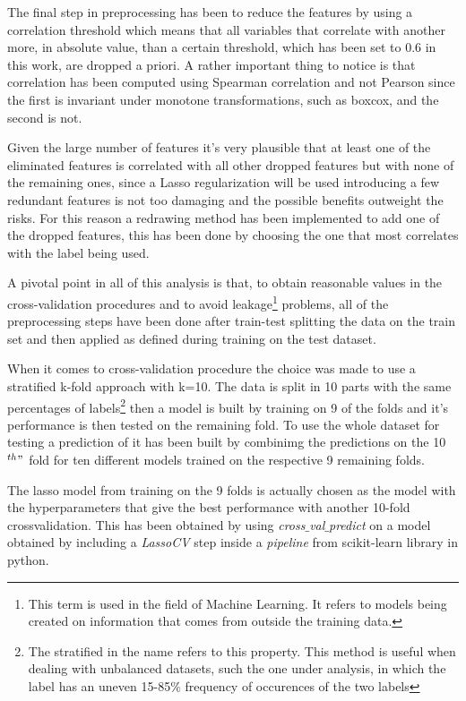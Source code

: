 The final step in preprocessing has been to reduce the features by using a correlation threshold which means that all variables that correlate with another more, in absolute value, than a certain threshold, which has been set to 0.6 in this work, are dropped a priori. A rather important thing to notice is that correlation has been computed using Spearman correlation and not Pearson since the first is invariant under monotone transformations, such as boxcox, and the second is not.

Given the large number of features it's very plausible that at least one of the eliminated features is correlated with all other dropped features but with none of the remaining ones, since a Lasso regularization will be used introducing a few redundant features is not too damaging and the possible benefits outweight the risks. For this reason a redrawing method has been implemented to add one of the dropped features, this has been done by choosing the one that most correlates with the label being used.

A pivotal point in all of this analysis is that, to obtain reasonable values in the cross-validation procedures and to avoid leakage\footnote{This term is used in the field of Machine Learning. It refers to models being created on information that comes from outside the training data.} problems, all of the preprocessing steps have been done after train-test splitting the data on the train set and then applied as defined during training on the test dataset.

When it comes to cross-validation procedure the choice was made to use a stratified k-fold approach with k=10. The data is split in 10 parts with the same percentages of labels\footnote{The stratified in the name refers to this property. This method is useful when dealing with unbalanced datasets, such the one under analysis, in which the label has an uneven 15-85$\%$ frequency of occurences of the two labels} then a model is built by training on 9 of the folds and it's performance is then tested on the remaining fold. To use the whole dataset for testing a prediction of it has been built by combinimg the predictions on the 10$^{th}"$ fold for ten different models trained on the respective 9 remaining folds.

The lasso model from training on the 9 folds is actually chosen as the model with the hyperparameters that give the best performance with another 10-fold crossvalidation. This has been obtained by using \textit{cross$\_$val$\_$predict} on a model obtained by including a \textit{LassoCV} step inside a \textit{pipeline} from scikit-learn library in python. 

